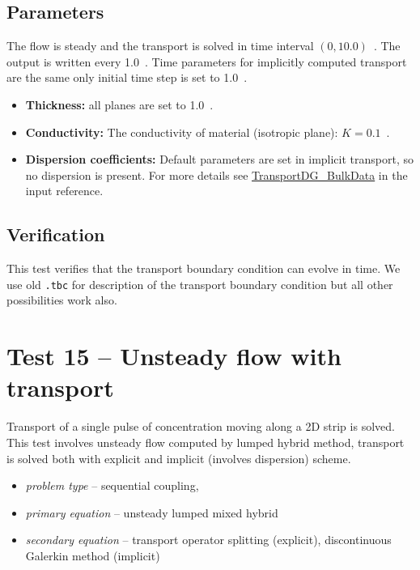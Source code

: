 \subsection*{Parameters}
The flow is steady and the transport is solved in time interval $(0,10.0)$~. The output is written every 
1.0~. Time parameters for implicitly computed transport are the same only initial time step is set to 1.0~.
%
\begin{itemize}
  \item \textbf{Thickness:} all planes are set to 1.0~.
  \item \textbf{Conductivity:} The conductivity of material (isotropic plane): $K=0.1$~.
  \item \textbf{Dispersion coefficients:} Default parameters are set in implicit transport, so no dispersion is present. 
        For more details see \hyperlink{IT::TransportDG-BulkData}{TransportDG\_BulkData} in the input reference.
\end{itemize}
%

\subsection*{Verification}
This test verifies that the transport boundary condition can evolve in time. We use old \verb'.tbc' for description 
of the transport boundary condition but all other possibilities work also.



\section{Test 15 -- Unsteady flow with transport}
Transport of a single pulse of concentration moving along a 2D strip is solved. This test involves unsteady flow computed by lumped hybrid method, transport is solved both with explicit and implicit (involves dispersion) scheme.
 
\begin{itemize} 
    \item \emph{problem type} -- sequential coupling, 
    \item \emph{primary equation} -- unsteady lumped mixed hybrid
    \item \emph{secondary equation} -- transport operator splitting (explicit), discontinuous Galerkin method (implicit)
  \end{itemize}

